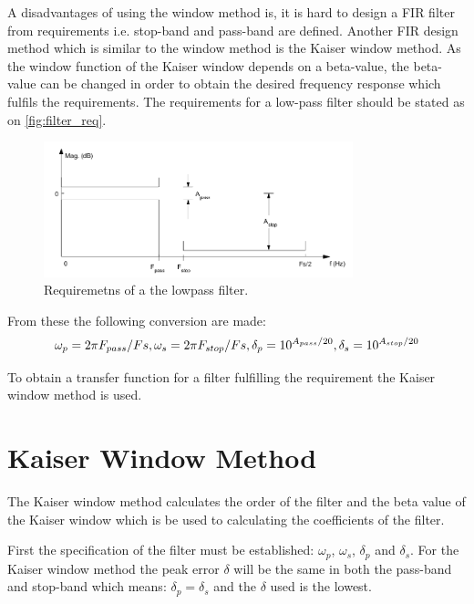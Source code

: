 A disadvantages of using the window method is, it is hard to design a FIR filter from requirements i.e. stop-band and pass-band are defined. Another FIR design method which is similar to the window method is the Kaiser window method. As the window function of the Kaiser window depends on a beta-value, the beta-value can be changed in order to obtain the desired frequency response which fulfils the requirements. The requirements for a low-pass filter should be stated as on \autoref{fig:filter_req}.
\begin{figure}[H]
\centering
\includegraphics[width=0.8\textwidth]{figures/filter_req.png}
\caption{Requiremetns of a the lowpass filter.}
\label{fig:filter_req}
\end{figure}
From these the following conversion are made:
\begin{equation}
\omega_p=2\pi F_{pass}/Fs,\\
\omega_s=2\pi F_{stop}/Fs,\\
\delta_p=10^{A_{pass}/20},\\
\delta_s=10^{A_{stop}/20}
\end{equation}

To obtain a transfer function for a filter fulfilling the requirement the Kaiser window method is used.

\section{Kaiser Window Method}
The Kaiser window method calculates the order of the filter and the beta value of the Kaiser window which is be used to calculating the coefficients of the filter.

First the specification of the filter must be established: $\omega_p$, $\omega_s$, $\delta_p$ and $\delta_s$. For the Kaiser window method the peak error $\delta$ will be the same in both the pass-band and stop-band which means: $\delta_p = \delta_s$ and the $\delta$ used is the lowest.

